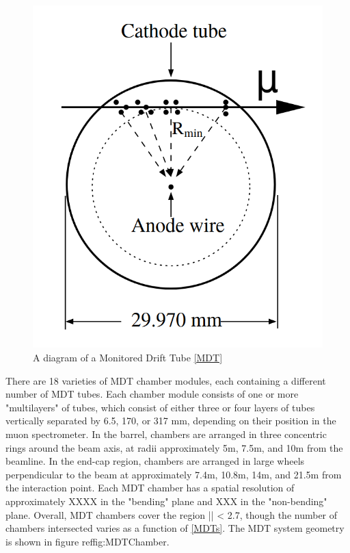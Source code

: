 \begin{figure}
  \includegraphics[width=\linewidth]{figures/detector_chapter/MDT.png}
  \caption{A diagram of a Monitored Drift Tube \ref{MDT}}
  \label{fig:MDT}
\end{figure}

There are 18 varieties of MDT chamber modules, each containing a different number of MDT tubes. Each chamber module consists of one or more "multilayers" of tubes, which consist of either three or four layers of tubes vertically separated by 6.5, 170, or 317 mm, depending on their position in the muon spectrometer. In the barrel, chambers are arranged in three concentric rings around the beam axis, at radii approximately 5m, 7.5m, and 10m from the beamline. In the end-cap region, chambers are arranged in large wheels perpendicular to the beam at approximately 7.4m, 10.8m, 14m, and 21.5m from the interaction point. Each MDT chamber has a spatial resolution of approximately XXXX in the "bending" \eta plane and XXX in the "non-bending" \phi plane. Overall, MDT chambers cover the region |\eta | < 2.7, though the number of chambers intersected varies as a function of \eta \ref{MDTs}. The MDT system geometry is shown in figure ref{fig:MDTChamber}. 

